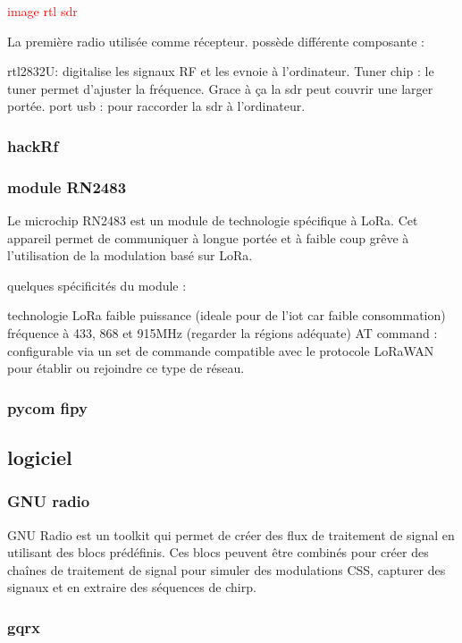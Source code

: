 \documentclass[12pt,a4paper,oneside, titlepage]{report}
\begin{document}
\textcolor{red}{image rtl sdr}

La première radio utilisée comme récepteur. possède différente composante :

rtl2832U: digitalise les signaux RF et les evnoie à l'ordinateur.
Tuner chip : le tuner permet d'ajuster la fréquence. Grace à ça la sdr peut couvrir une larger portée.
port usb : pour raccorder la sdr à l'ordinateur.

\subsubsection{hackRf}

\subsubsection{module RN2483}

Le microchip RN2483 est un module de technologie spécifique à LoRa. Cet appareil permet de communiquer à longue portée et à faible coup grêve à l'utilisation de la modulation basé sur LoRa.

quelques spécificités du module :

technologie LoRa
faible puissance (ideale pour de l'iot car faible consommation)
fréquence à 433, 868 et 915MHz (regarder la régions adéquate)
AT command : configurable via un set de commande
compatible avec le protocole LoRaWAN pour établir ou rejoindre ce type de réseau.

\subsubsection{pycom fipy}

\subsection{logiciel}

\subsubsection{GNU radio}

GNU Radio est un toolkit qui permet de créer des flux de traitement de signal en utilisant des blocs prédéfinis. Ces blocs peuvent être combinés pour créer des chaînes de traitement de signal pour simuler des modulations CSS, capturer des signaux et en extraire des séquences de chirp.

\subsubsection{gqrx}
\end{document}
